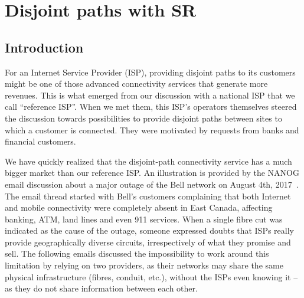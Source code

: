 \chapter{Disjoint paths with SR}
\label{chapter:disjoint}

\section*{Introduction}

For an Internet Service Provider (ISP), providing disjoint paths to its
customers might be one of those advanced connectivity services that generate
more revenues. This is what emerged from our discussion with a national ISP that
we call ``reference ISP''. When we met them, this ISP's operators themselves
steered the discussion towards possibilities to provide disjoint paths between
sites to which a customer is connected. They were motivated by requests from
banks and financial customers.

We have quickly realized that the disjoint-path connectivity service has a much
bigger market than our reference ISP. An illustration is provided by the
NANOG email discussion about a major outage of the Bell network on August
4th, 2017~\cite{refnanog}. The email thread started with Bell's customers
complaining that both Internet and mobile connectivity were completely absent in
East Canada, affecting banking, ATM, land lines and even 911 services. When a
single fibre cut was indicated as the cause of the outage, someone expressed
doubts that ISPs really provide geographically diverse circuits, irrespectively
of what they promise and sell. The following emails discussed the impossibility
to work around this limitation by relying on two providers, as their networks
may share the same physical infrastructure (fibres, conduit, etc.), without the
ISPs even knowing it -- as they do not share information between each other.

